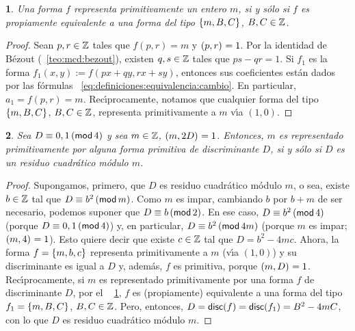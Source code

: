 \theoremstyle{plain}
\newtheorem{teoRepresentaciones}{\teoname}[section]
\newtheorem{lemaRepresentaciones}[teoRepresentaciones]{\lemaname}
\newtheorem{coroRepresentaciones}[teoRepresentaciones]{\coroname}

\theoremstyle{definition}
\newtheorem{defRepresentaciones}[teoRepresentaciones]{}
\newtheorem{obsRepresentaciones}[teoRepresentaciones]{\obsname}


\begin{lemaRepresentaciones}\label{lema:representaciones:primitivamente}
	Una forma $f$ representa primitivamente un entero $m$, si y s\'olo
	si $f$ es propiamente equivalente a una forma del tipo
	$\binaria{m,B,C}$, $B,C\in\Enteros$.
\end{lemaRepresentaciones}

\begin{proof}
	Sean $p,r\in\Enteros$ tales que $f(p,r)=m$ y $\mcd{p,r}=1$. Por
	la identidad de B\'ezout (\teoname~\ref{teo:mcd:bezout}), existen
	$q,s\in\Enteros$ tales que $ps-qr=1$. Si $f_1$ es la forma
	$f_1(x,y):=f(px+qy,rx+sy)$, entonces sus coeficientes est\'an
	dados por las f\'ormulas~%
	\eqref{eq:definiciones:equivalencia:cambio}. En particular,
	$a_1=f(p,r)=m$. Rec\'{\i}procamente, notamos que cualquier
	forma del tipo $\binaria{m,B,C}$, $B,C\in\Enteros$, representa
	primitivamente a $m$ v\'{\i}a $(1,0)$.
\end{proof}

\begin{lemaRepresentaciones}\label{lema:representaciones:primitiva}
	Sea $D\equiv 0,1\tmodulo[4]$ y sea $m\in\Enteros$,
	$\mcd{m,2D}=1$. Entonces, $m$ es representado primitivamente
	por \emph{alguna} forma primitiva de discriminante $D$,
	si y s\'olo si $D$ es un residuo cuadr\'atico m\'odulo $m$.
\end{lemaRepresentaciones}

\begin{proof}
	Supongamos, primero, que $D$ es residuo cuadr\'atico m\'odulo
	$m$, o sea, existe $b\in\Enteros$ tal que $D\equiv b^2\tmodulo[m]$.
	Como $m$ es impar, cambiando $b$ por $b+m$ de ser necesario,
	podemos suponer que $D\equiv b\tmodulo[2]$. En ese caso,
	$D\equiv b^2\tmodulo[4]$ (porque $D\equiv 0,1\tmodulo[4]$) y,
	en particular, $D\equiv b^2\tmodulo[4m]$ (porque $m$ es impar;
	$\mcd{m,4}=1$). Esto quiere decir que existe $c\in\Enteros$ tal
	que $D=b^2-4mc$. Ahora, la forma $f=\binaria{m,b,c}$ representa
	primitivamente a $m$ (v\'{\i}a $(1,0)$) y su discriminante es
	igual a $D$ y, adem\'as, $f$ es primitiva, porque $\mcd{m,D}=1$.
	Rec\'{\i}procamente, si $m$ es representado primitivamente por
	una forma $f$ de discriminante $D$, por el \lemaname~%
	\ref{lema:representaciones:primitivamente}, $f$ es (propiamente)
	equivalente a una forma del tipo $f_1=\binaria{m,B,C}$,
	$B,C\in\Enteros$. Pero, entonces,
	\begin{math}
		D=\discriminante(f)=\discriminante(f_1)=B^2-4mC
	\end{math},
	con lo que $D$ es residuo cuadr\'atico m\'odulo $m$.
\end{proof}


